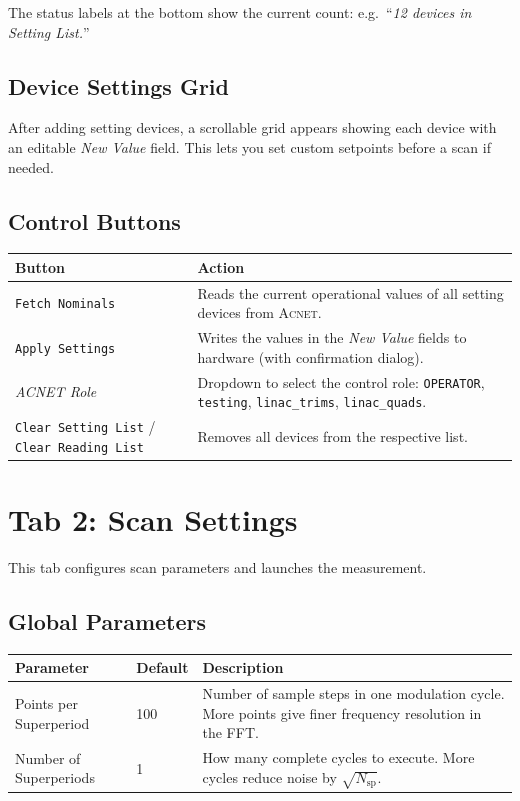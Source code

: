 \documentclass[11pt,a4paper,twoside]{report}
\newcommand{\acnet}{\textsc{Acnet}}
\newcommand{\btn}[1]{\colorbox{accent!12}{\texttt{\small #1}}}
\newcommand{\field}[1]{\textit{#1}}
\begin{document}
The status labels at the bottom show the current count: e.g.\ ``\textit{12 devices in Setting List.}''

\subsection{Device Settings Grid}

After adding setting devices, a scrollable grid appears showing each device with an editable \field{New Value} field. This lets you set custom setpoints before a scan if needed.

\subsection{Control Buttons}

\begin{tabularx}{\textwidth}{lX}
  \toprule
  \textbf{Button} & \textbf{Action} \\
  \midrule
  \btn{Fetch Nominals}   & Reads the current operational values of all setting devices from \acnet{}. \\
  \btn{Apply Settings}    & Writes the values in the \field{New Value} fields to hardware (with confirmation dialog). \\
  \field{ACNET Role}      & Dropdown to select the control role: \texttt{OPERATOR}, \texttt{testing}, \texttt{linac\_trims}, \texttt{linac\_quads}. \\
  \btn{Clear Setting List} / \btn{Clear Reading List} & Removes all devices from the respective list. \\
  \bottomrule
\end{tabularx}

\section{Tab 2: Scan Settings}\label{sec:tab2}

This tab configures scan parameters and launches the measurement.

\subsection{Global Parameters}

\begin{tabularx}{\textwidth}{lp{2cm}X}
  \toprule
  \textbf{Parameter} & \textbf{Default} & \textbf{Description} \\
  \midrule
  Points per Superperiod & 100 & Number of sample steps in one modulation cycle. More points give finer frequency resolution in the FFT. \\
  Number of Superperiods & 1   & How many complete cycles to execute. More cycles reduce noise by $\sqrt{N_{\text{sp}}}$. \\
  \bottomrule
\end{tabularx}
\end{document}

